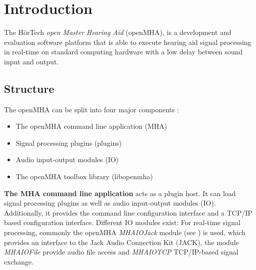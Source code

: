 
\section{Introduction}
The H\"{o}rTech \emph{open Master Hearing Aid} (openMHA), is a development and evaluation software platform that is able to execute hearing aid signal processing in real-\/time on standard computing hardware with a low delay between sound input and output.

\subsection{Structure}\label{index_str}
The openMHA can be split into four major components :
\begin{itemize}
\item The openMHA command line application (MHA)
\item Signal processing plugins (plugins)
\item Audio input-\/output modules (IO)
\item The openMHA toolbox library (libopenmha)
\end{itemize} 

{\bf The MHA command line application} acts as a plugin host. It can load signal processing plugins as well as audio input-\/output modules (IO). Additionally, it provides the command line configuration interface and a TCP/IP based configuration interface. Different IO modules exist: For real-\/time signal processing, commonly the openMHA \emph{MHAIOJack} module (see \PluginManual) is used, which provides an interface to the Jack Audio Connection Kit (JACK), the module \emph{MHAIOFile} provide audio file access and \emph{MHAIOTCP} TCP/IP-\/based signal exchange.

